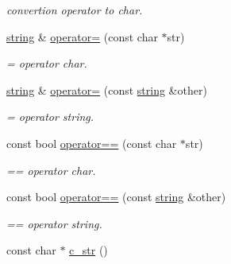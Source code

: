 \begin{DoxyCompactItemize}
\begin{DoxyCompactList}\small\item\em convertion operator to char. \end{DoxyCompactList}\item 
\hyperlink{class_ensum_1_1string}{string} \& \hyperlink{class_ensum_1_1string_ae48b8f643d8cd3ff379a51484ea738d1}{operator=} (const char $\ast$str)\hypertarget{class_ensum_1_1string_ae48b8f643d8cd3ff379a51484ea738d1}{}\label{class_ensum_1_1string_ae48b8f643d8cd3ff379a51484ea738d1}

\begin{DoxyCompactList}\small\item\em = operator char. \end{DoxyCompactList}\item 
\hyperlink{class_ensum_1_1string}{string} \& \hyperlink{class_ensum_1_1string_a7903e871b1cf12584d746536241fa7ea}{operator=} (const \hyperlink{class_ensum_1_1string}{string} \&other)\hypertarget{class_ensum_1_1string_a7903e871b1cf12584d746536241fa7ea}{}\label{class_ensum_1_1string_a7903e871b1cf12584d746536241fa7ea}

\begin{DoxyCompactList}\small\item\em = operator string. \end{DoxyCompactList}\item 
const bool \hyperlink{class_ensum_1_1string_a6b5ab08eb5ef197bedb9e55e2eca0754}{operator==} (const char $\ast$str)\hypertarget{class_ensum_1_1string_a6b5ab08eb5ef197bedb9e55e2eca0754}{}\label{class_ensum_1_1string_a6b5ab08eb5ef197bedb9e55e2eca0754}

\begin{DoxyCompactList}\small\item\em == operator char. \end{DoxyCompactList}\item 
const bool \hyperlink{class_ensum_1_1string_a6429683caad1908c30cb77b4aa00ff4f}{operator==} (const \hyperlink{class_ensum_1_1string}{string} \&other)\hypertarget{class_ensum_1_1string_a6429683caad1908c30cb77b4aa00ff4f}{}\label{class_ensum_1_1string_a6429683caad1908c30cb77b4aa00ff4f}

\begin{DoxyCompactList}\small\item\em == operator string. \end{DoxyCompactList}\item 
const char $\ast$ \hyperlink{class_ensum_1_1string_ae136b1638499649ef96441b26baa840a}{c\+\_\+str} ()\hypertarget{class_ensum_1_1string_ae136b1638499649ef96441b26baa840a}{}\label{class_ensum_1_1string_ae136b1638499649ef96441b26baa840a}


\end{DoxyCompactItemize}
